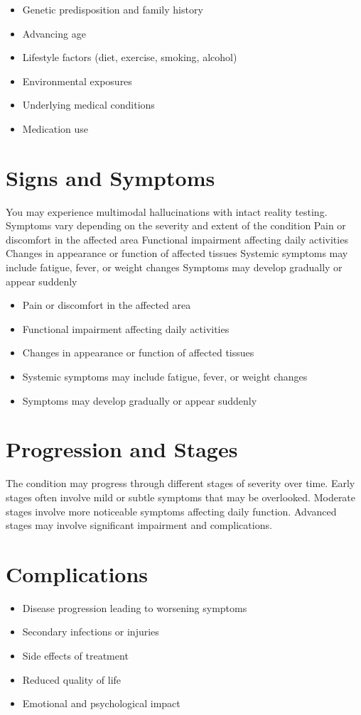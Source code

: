 \begin{itemize}[noitemsep]
  \item Genetic predisposition and family history
  \item Advancing age
  \item Lifestyle factors (diet, exercise, smoking, alcohol)
  \item Environmental exposures
  \item Underlying medical conditions
  \item Medication use
\end{itemize}
\section{Signs and Symptoms}
You may experience multimodal hallucinations with intact reality testing. Symptoms vary depending on the severity and extent of the condition Pain or discomfort in the affected area Functional impairment affecting daily activities Changes in appearance or function of affected tissues Systemic symptoms may include fatigue, fever, or weight changes Symptoms may develop gradually or appear suddenly

\begin{itemize}[noitemsep]
  \item Pain or discomfort in the affected area
  \item Functional impairment affecting daily activities
  \item Changes in appearance or function of affected tissues
  \item Systemic symptoms may include fatigue, fever, or weight changes
  \item Symptoms may develop gradually or appear suddenly
\end{itemize}
\section{Progression and Stages}
The condition may progress through different stages of severity over time. Early stages often involve mild or subtle symptoms that may be overlooked. Moderate stages involve more noticeable symptoms affecting daily function. Advanced stages may involve significant impairment and complications.
\section{Complications}
\begin{itemize}[noitemsep]
  \item Disease progression leading to worsening symptoms
  \item Secondary infections or injuries
  \item Side effects of treatment
  \item Reduced quality of life
  \item Emotional and psychological impact
\end{itemize}
